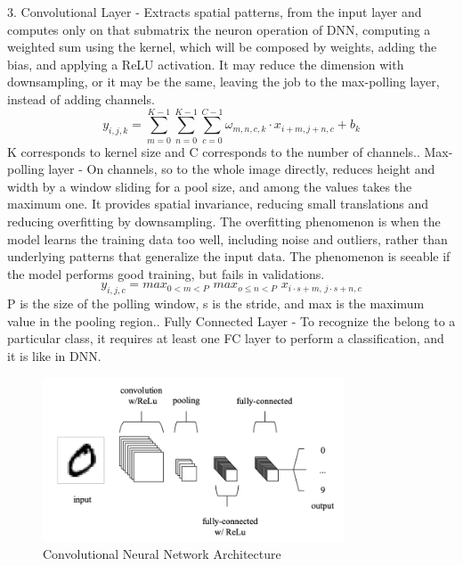 3. Convolutional Layer - Extracts spatial patterns, from the input layer and computes only on that submatrix the neuron operation of DNN, computing a weighted sum using the kernel, which will be composed by weights, adding the bias, and applying a ReLU activation. It may reduce the dimension with downsampling, or it may be the same, leaving the job to the max-polling layer, instead of adding channels.\newline
\begin{equation}
    y_{i,j,k}=\sum_{m=0}^{K-1}\sum_{n=0}^{K-1}\sum_{c=0}^{C-1}\omega_{m,n,c,k}\cdot x_{i+m,j+n,c}+b_k
\end{equation}
K corresponds to kernel size and C corresponds to the number of channels.. Max-polling layer - On channels, so to the whole image directly, reduces height and width by a window sliding for a pool size, and among the values takes the maximum one. It provides spatial invariance, reducing small translations and reducing overfitting by downsampling. The overfitting phenomenon is when the model learns the training data too well, including noise and outliers, rather than underlying patterns that generalize the input data. The phenomenon is seeable if the model performs good training, but fails in validations.
\begin{equation}
    y_{i,j,c}=max_{0<m<P}\,\,max_{o\leq n<P}\,\,x_{i\cdot s+m,\,j\cdot s+n,c}
\end{equation}
P is the size of the polling window, s is the stride, and max is the maximum value in the pooling region.. Fully Connected Layer - To recognize the belong to a particular class, it requires at least one FC layer to perform a classification, and it is like in DNN.
\begin{center}
    \begin{figure}[!h]
        \centering
        \includegraphics[width=0.8\textwidth]{images/2.06 Convolutional Neural Network.png}
        \caption{Convolutional Neural Network Architecture \cite{environments10120218}}
        \label{fig:convolutional neural network architecture}
    \end{figure}
\end{center}
